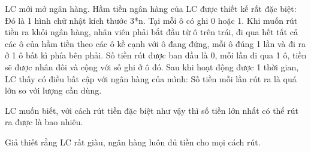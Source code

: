 LC mới mở ngân hàng. Hầm tiền ngân hàng của LC được thiết kế rất đặc biệt: Đó là 1 hình chữ nhật kích thước 3*n. Tại mỗi ô có ghi 0 hoặc 1. Khi muốn rút tiền ra khỏi ngân hàng, nhân viên phải bắt đầu từ ô trên trái, đi qua hết tất cả các ô của hầm tiền theo các ô kề cạnh với ô đang đứng, mỗi ô đúng 1 lần và đi ra ở 1 ô bất kì phía bên phải. Số tiền rút được ban đầu là 0, mỗi lần đi qua 1 ô, tiền sẽ được nhân đôi và cộng với số ghi ở ô đó. Sau khi hoạt động được 1 thời gian, LC thấy có điều bất cập với ngân hàng của mình: Số tiền mỗi lần rút ra là quá lớn so với lượng cần dùng.  

   LC muốn biết, với cách rút tiền đặc biệt như vậy thì số tiền lớn nhất có thể rút ra được là bao nhiêu.  

Giả thiết rằng LC rất giàu, ngân hàng luôn đủ tiền cho mọi cách rút.